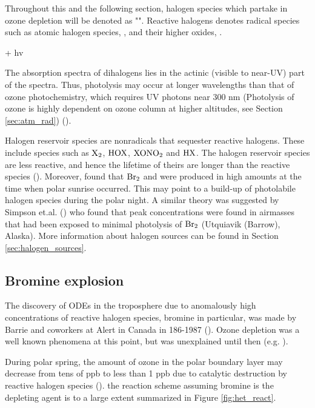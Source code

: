 Throughout this and the following section, halogen species which partake in ozone depletion will be denoted as "". Reactive halogens denotes radical species such as atomic halogen species, , and their higher oxides, . 

\begin{reaction}
     + hv  \label{R:1}
\end{reaction}

The absorption spectra of dihalogens lies in the actinic (visible to near-UV) part of the spectra. Thus, photolysis may occur at longer wavelengths than that of ozone photochemistry, which requires UV photons near 300 nm (Photolysis of ozone is highly dependent on ozone column at higher altitudes, see Section \ref{sec:atm_rad}) (\cite{Simpson2015}).

\medskip

Halogen reservoir species are nonradicals that sequester reactive halogens. These include species such as $\mathrm{X_2}$, $\mathrm{HOX}$, $\mathrm{XONO_2}$ and $\mathrm{HX}$. The halogen reservoir species are less reactive, and hence the lifetime of theirs are longer than the reactive species (\cite{Simpson2015}). Moreover, \cite{Foster2001} found that $\mathrm{Br_2}$ and  were produced in high amounts at the time when polar sunrise occurred. This may point to a build-up of photolabile halogen species during the polar night. A similar theory was suggested by Simpson et.al. (\cite{Simpson2018}) who found that peak  concentrations were found in airmasses that had been exposed to minimal photolysis of $\mathrm{Br_2}$ (Utquiavik (Barrow), Alaska). More information about halogen sources can be found in Section \ref{sec:halogen_sources}. 



\subsection{Bromine explosion}\label{sec:BE}

The discovery of ODEs in the troposphere due to anomalously high concentrations of reactive halogen species, bromine in particular, was made by Barrie and coworkers at Alert in Canada in 186-1987 (\cite{BARRIE1986643}). Ozone depletion was a well known phenomena at this point, but was unexplained until then (e.g. \cite{Oltmans1981}). 

\medskip

During polar spring, the amount of ozone in the polar boundary layer may decrease from tens of ppb to less than 1 ppb due to catalytic destruction by reactive halogen species (\cite{CAO}). the reaction scheme assuming bromine is the depleting agent is to a large extent summarized in Figure \ref{fig:het_react}. 

